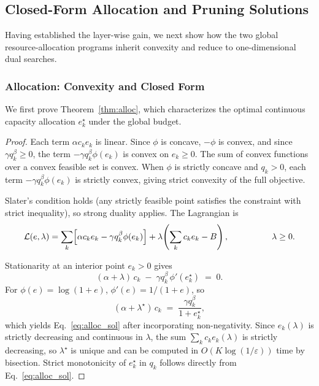 \documentclass[accepted]{uai2026}%
\theoremstyle{remark}%
\begin{document}
\subsection{Closed-Form Allocation and Pruning Solutions}
\label{appendix:mdl_programs}
Having established the layer-wise gain, we next show how the two global
resource-allocation programs inherit convexity and reduce to one-dimensional
dual searches.

\subsubsection{Allocation: Convexity and Closed Form}
We first prove Theorem~\ref{thm:alloc}, which characterizes the optimal
continuous capacity allocation $e_k^\star$ under the global budget.
\begin{proof}
\label{proof:theorem2}
Each term $\alpha c_k e_k$ is linear.
Since $\phi$ is concave, $-\phi$ is convex, and since
$\gamma q_k^{\beta} \ge 0$, the term $-\gamma q_k^{\beta}\phi(e_k)$
is convex on $e_k \ge 0$.
The sum of convex functions over a convex feasible set is convex.
When $\phi$ is strictly concave and $q_k > 0$,
each term $-\gamma q_k^{\beta}\phi(e_k)$ is strictly convex,
giving strict convexity of the full objective.

Slater's condition \citet{boyd2004convex} holds (any strictly feasible point satisfies the
constraint with strict inequality), so strong duality applies.
The Lagrangian is
\begin{equation}
  \mathcal{L}(e,\lambda)
  =
  \sum_k
  \Bigl[\alpha c_k e_k - \gamma q_k^{\beta}\phi(e_k)\Bigr]
  + \lambda\!\left(\sum_k c_k e_k - B\right)
  ,\hspace{5em} \lambda \ge 0.    
\end{equation}

Stationarity at an interior point $e_k > 0$ gives
\[
  (\alpha + \lambda)\,c_k
  \;-\;
  \gamma q_k^{\beta}\,\phi'(e_k^{\star})
  \;=\; 0.
\]
For $\phi(e) = \log(1+e)$, $\phi'(e) = 1/(1+e)$, so
\[
  (\alpha + \lambda^{\star})\,c_k
  \;=\;
  \frac{\gamma q_k^{\beta}}{1 + e_k^{\star}},
\]
which yields Eq.~\eqref{eq:alloc_sol} after incorporating non-negativity.
Since $e_k(\lambda)$ is strictly decreasing and continuous in $\lambda$,
the sum $\sum_k c_k e_k(\lambda)$ is strictly decreasing, so
$\lambda^{\star}$ is unique and can be computed in
$O(K\log(1/\varepsilon))$ time by bisection.
Strict monotonicity of $e_k^{\star}$ in $q_k$ follows directly
from Eq.~\eqref{eq:alloc_sol}.
\end{proof}
\end{document}
